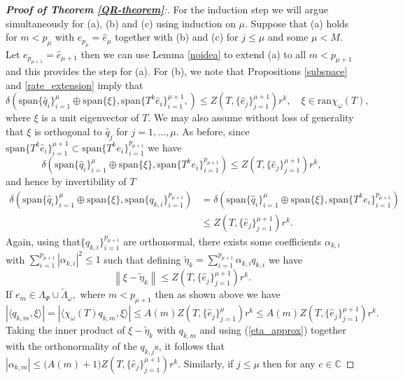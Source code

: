 \documentclass[a4paper,10pt]{article}
\begin{document}
\begin{proof}[\textbf{Proof of Theorem \ref{QR-theorem}}:]
For the induction step we will argue simultaneously for (a), (b) and (c) using induction on $\mu$. Suppose that (a) holds for $m<p_{\mu}$ with $e_{p_\mu}=\hat e_\mu$ together with (b) and (c) for $j\leq \mu$ and some $\mu<M$. Let $e_{p_{\mu+1}}=\hat e_{\mu+1}$ then we can use Lemma \ref{noidea} to extend (a) to all $m<p_{\mu+1}$ and this provides the step for (a). For (b), we note that Propositions \ref{subspace} and \ref{rate_extension} imply that
\begin{equation}\label{a}
\delta(\mathrm{span}\{\hat q_i\}_{i=1}^{\mu} 
  \oplus \mathrm{span}\{\xi\},\mathrm{span}\{T^k\hat
  e_i\}_{i = 1}^{\mu+1}, )\leq Z(T,\{\hat e_j\}_{j=1}^{\mu+1})r^k, \quad \xi \in \mathrm{ran}\chi_{\omega}(T),
\end{equation}
where $\xi$ is a unit eigenvector of $T.$ We may also assume without loss of generality that $\xi$ is orthogonal to $\hat q_j$ for $j=1,...,\mu$. As before, since $\mathrm{span}\{T^k\hat
  e_i\}_{i=1}^{\mu+1} \subset  \mathrm{span}\{T^ke_i\}_{i=1}^{p_{\mu+1}}
$ we have
$$
\delta(
 \mathrm{span}\{\hat q_i\}_{i=1}^{\mu} \oplus \mathrm{span}\{\xi\},
 \mathrm{span}\{T^ke_i\}_{i=1}^{p_{\mu+1}}) \leq Z(T,\{\hat e_j\}_{j=1}^{\mu+1})r^k,
$$
and hence by invertibility of $T$
\begin{equation}\label{n}
\begin{split}
\delta(\mathrm{span}\{\hat q_i\}_{i=1}^{\mu} \oplus \mathrm{span}\{\xi\},\mathrm{span}\{q_{k,i}\}_{i=1}^{p_{\mu+1}})&=\delta(\mathrm{span}\{\hat q_i\}_{i=1}^{\mu} \oplus \mathrm{span}\{\xi\}, \mathrm{span}\{T^ke_i\}_{i=1}^{p_{\mu+1}})\\
&\leq Z(T,\{\hat e_j\}_{j=1}^{\mu+1})r^k.
\end{split}
\end{equation}  
Again, using that$\{q_{k,i}\}_{i=1}^{p_{\mu+1}}$ are orthonormal, there exists some coefficients $\alpha_{k,i}$ with $\sum_{i=1}^{p_{\mu+1}}|\alpha_{k,i}|^2 \leq 1$ such that defining $\tilde \eta_k =  \sum_{i=1}^{p_{\mu+1}}\alpha_{k,i}q_{k,i}$ we have
\begin{equation}
\label{eta_approx}
\left\|\xi-\tilde \eta_k\right\|\leq Z(T,\{\hat e_j\}_{j=1}^{\mu+1})r^k.
\end{equation}
If $e_m \in \Lambda_{\Psi} \cup  \tilde \Lambda_{\omega},$ where $m < {p_{\mu+1}}$ then as shown above we have
$$
\left|\langle q_{k,m},\xi\rangle\right|=\left|\langle \chi_{\omega}(T)q_{k,m},\xi\rangle\right|\leq A(m)Z(T,\{\hat e_j\}_{j=1}^{\mu})r^k\leq A(m)Z(T,\{\hat e_j\}_{j=1}^{\mu+1})r^k.
$$
Taking the inner product of $\xi-\tilde \eta_k$ with $q_{k,m}$ and using (\ref{eta_approx}) together with the orthonormality of the $q_{k,j}$s, it follows that $\left|\alpha_{k,m}\right|\leq \big(A(m)+1\big)Z(T,\{\hat e_j\}_{j=1}^{\mu+1})r^k$. Similarly, if $j\leq \mu$ then for any $c\in\mathbb{C}$

\end{proof}
\end{document}
